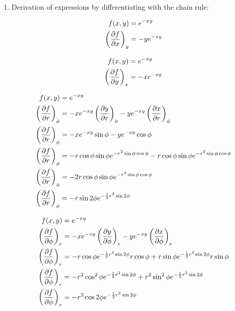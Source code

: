 \documentclass[10pt,\jkfside,a4paper]{article}
\begin{document}
\begin{enumerate}
\begin{enumerate}
\item Derivation of expressions by differentiating with the chain rule:

\begin{equation}
\begin{split}
f(x, y) &= e^{-xy} \\
\left(\pdv{f}{x}\right)_y &= -ye^{-xy} \\
\end{split}
\end{equation}

\begin{equation}
\begin{split}
f(x, y) &= e^{-xy} \\
\left(\pdv{f}{y}\right)_x &= -xe^{-xy} \\
\end{split}
\end{equation}

\begin{equation}
\begin{split}
f(x, y) &= e^{-xy} \\
\left(\pdv{f}{r}\right)_\phi &= - xe^{-xy}\left(\pdv{y}{r}\right)_\phi - ye^{-xy}\left(\pdv{x}{r}\right)_\phi \\
\left(\pdv{f}{r}\right)_\phi &= - xe^{-xy}\sin \phi - ye^{-xy}\cos \phi \\
\left(\pdv{f}{r}\right)_\phi &= - r \cos \phi \sin \phi e^{-r^2 \sin \phi \cos \phi} - r \cos \phi \sin \phi e^{-r^2 \sin \phi \cos \phi} \\
\left(\pdv{f}{r}\right)_\phi &= - 2r \cos \phi \sin \phi e^{-r^2 \sin \phi \cos \phi}\\
\left(\pdv{f}{r}\right)_\phi &= - r \sin 2\phi e^{-\frac{1}{2} r^2 \sin 2\phi}\\
\end{split}
\end{equation}

\begin{equation}
\begin{split}
f(x, y) &= e^{-xy} \\
\left(\pdv{f}{\phi}\right)_r &= - xe^{-xy}\left(\pdv{y}{\phi}\right)_r - ye^{-xy}\left(\pdv{x}{\phi}\right)_r \\
\left(\pdv{f}{\phi}\right)_r &= - r \cos \phi e^{-\frac{1}{2}r^2 \sin 2 \phi } r \cos \phi + r \sin \phi e^{-\frac{1}{2}r^2 \sin 2 \phi} r \sin \phi \\
\left(\pdv{f}{\phi}\right)_r &= - r^2 \cos^2 \phi e^{-\frac{1}{2}r^2 \sin 2 \phi } + r^2 \sin^2 \phi e^{-\frac{1}{2}r^2 \sin 2 \phi}\\
\left(\pdv{f}{\phi}\right)_r &= - r^2 \cos 2 \phi e^{-\frac{1}{2}r^2 \sin 2 \phi }\\
\end{split}
\end{equation}


\end{enumerate}
\end{enumerate}
\end{document}
